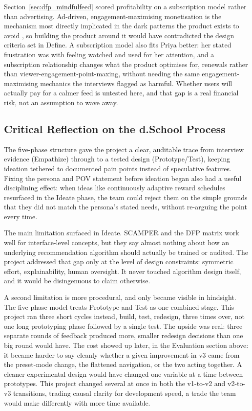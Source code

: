 \documentclass[11pt]{article}
\begin{document}
Section~\ref{sec:dfp_mindfulfeed} scored profitability on a subscription model rather than advertising. Ad-driven, engagement-maximising monetisation is the mechanism most directly implicated in the dark patterns the product exists to avoid \parencites[2]{5127387}, so building the product around it would have contradicted the design criteria set in Define. A subscription model also fits Priya better: her stated frustration was with feeling watched and used for her attention, and a subscription relationship changes what the product optimises for, renewals rather than viewer-engagement-point-maxing, without needing the same engagement-maximising mechanics the interviews flagged as harmful. Whether users will actually pay for a calmer feed is untested here, and that gap is a real financial risk, not an assumption to wave away.

\subsection{Critical Reflection on the d.School Process}
\label{sec:dschool_critical_reflection}
The five-phase structure gave the project a clear, auditable trace from interview evidence (Empathize) through to a tested design (Prototype/Test), keeping ideation tethered to documented pain points instead of speculative features. Fixing the persona and POV statement before ideation began also had a useful disciplining effect: when ideas like continuously adaptive reward schedules resurfaced in the Ideate phase, the team could reject them on the simple grounds that they did not match the persona's stated needs, without re-arguing the point every time.

The main limitation surfaced in Ideate. SCAMPER and the DFP matrix work well for interface-level concepts, but they say almost nothing about how an underlying recommendation algorithm should actually be trained or audited. The project addressed that gap only at the level of design constraints: symmetric effort, explainability, human oversight. It never touched algorithm design itself, and it would be disingenuous to claim otherwise.

A second limitation is more procedural, and only became visible in hindsight. The five-phase model treats Prototype and Test as one combined stage. This project ran three short cycles instead, build, test, redesign, three times over, not one long prototyping phase followed by a single test. The upside was real: three separate rounds of feedback produced more, smaller redesign decisions than one big round would have. The cost showed up later, in the Evaluation section above: it became harder to say cleanly whether a given improvement in v3 came from the preset-mode change, the flattened navigation, or the two acting together. A cleaner experimental design would have changed one variable at a time between prototypes. This project changed several at once in both the v1-to-v2 and v2-to-v3 transitions, trading causal clarity for development speed, a trade the team would make differently with more time available.
\end{document}
